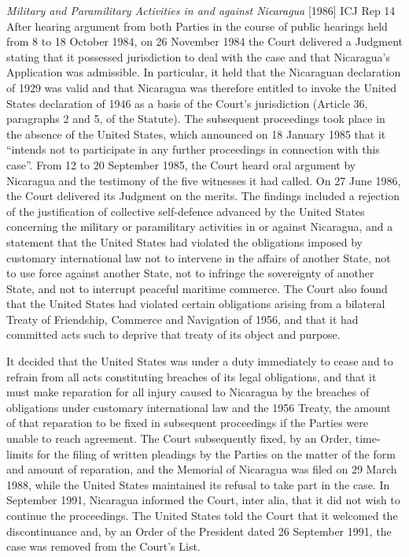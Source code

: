 \begin{casedetails}{\textit{Military and Paramilitary Activities in and against Nicaragua} [1986] ICJ Rep 14}
    After hearing argument from both Parties in the course of public hearings held from 8 to 18 October 1984, on 26 November 1984 the Court delivered a Judgment stating that it possessed jurisdiction to deal with the case and that Nicaragua's Application was admissible. In particular, it held that the Nicaraguan declaration of 1929 was valid and that Nicaragua was therefore entitled to invoke the United States declaration of 1946 as a basis of the Court's jurisdiction (Article 36, paragraphs 2 and 5, of the Statute). The subsequent proceedings took place in the absence of the United States, which announced on 18 January 1985 that it “intends not to participate in any further proceedings in connection with this case”. From 12 to 20 September 1985, the Court heard oral argument by Nicaragua and the testimony of the five witnesses it had called. On 27 June 1986, the Court delivered its Judgment on the merits. The findings included a rejection of the justification of collective self-defence advanced by the United States concerning the military or paramilitary activities in or against Nicaragua, and a statement that the United States had violated the obligations imposed by customary international law not to intervene in the affairs of another State, not to use force against another State, not to infringe the sovereignty of another State, and not to interrupt peaceful maritime commerce. The Court also found that the United States had violated certain obligations arising from a bilateral Treaty of Friendship, Commerce and Navigation of 1956, and that it had committed acts such to deprive that treaty of its object and purpose.

    \vspace{\baselineskip}
    
    It decided that the United States was under a duty immediately to cease and to refrain from all acts constituting breaches of its legal obligations, and that it must make reparation for all injury caused to Nicaragua by the breaches of obligations under customary international law and the 1956 Treaty, the amount of that reparation to be fixed in subsequent proceedings if the Parties were unable to reach agreement. The Court subsequently fixed, by an Order, time-limits for the filing of written pleadings by the Parties on the matter of the form and amount of reparation, and the Memorial of Nicaragua was filed on 29 March 1988, while the United States maintained its refusal to take part in the case. In September 1991, Nicaragua informed the Court, inter alia, that it did not wish to continue the proceedings. The United States told the Court that it welcomed the discontinuance and, by an Order of the President dated 26 September 1991, the case was removed from the Court's List.


\end{casedetails}
